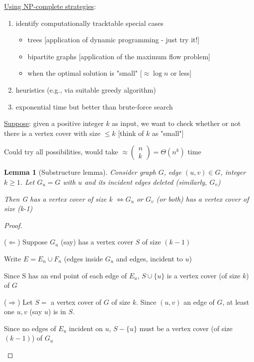 \documentclass[a4paper,12pt]{article}
\theoremstyle{plain}
\newtheorem*{lemma}{Lemma}
\theoremstyle{definition}
\theoremstyle{remark}
\begin{document}
\underline{Using NP-complete strategies}:
\begin{enumerate}
	\item identify computationally tracktable special cases
	\begin{itemize}
		\item trees [application of dynamic programming - just try it!]
		\item bipartite graphs [application of the maximum flow problem]
		\item when the optimal solution is "small" [$\approx \log n$ or less]
	\end{itemize}
	\item heuristics (e.g., via suitable greedy algorithm)
	\item exponential time but better than brute-force search
\end{enumerate}

\underline{Suppose}: given a positive integer $k$ as input, we want to check whether or not there is a vertex cover with size $\leq k$ [think of $k$ as "small"]

Could try all possibilities, would take $\approx \left(\begin{aligned}n\\k\end{aligned}\right) = \Theta(n^k)$ time

\begin{lemma}
[Substructure lemma] Consider graph $G$, edge $(u,v) \in G$, integer $k \geq 1$.
Let $G_u = G$ with $u$ and its incident edges deleted (similarly, $G_v$)

Then G has a vertex cover of size k $\iff G_u$ or $G_v$ (or both) has a vertex cover of size (k-1)
\end{lemma}
\begin{proof}
\begin{description}
	\item{($\Leftarrow$)} Suppose $G_u$ (say) has a vertex cover $S$ of size $(k-1)$

	Write $E = E_n \cup F_n$ (edges inside $G_u$ and edges, incident to $u$)

	Since S has an end point of each edge of $E_u$, $S \cup \{u\}$ is a vertex cover (of size $k$) of $G$
	\item{($\Rightarrow$)} Let $S =$ a vertex cover of $G$ of size $k$.
	Since $(u,v)$ an edge of $G$, at least one $u, v$ (say $u$) is in $S$.

	Since no edges of $E_u$ incident on $u$, $S - \{u\}$ must be a vertex cover (of size $(k-1)$) of $G_u$
\end{description}
\end{proof}
\end{document}
